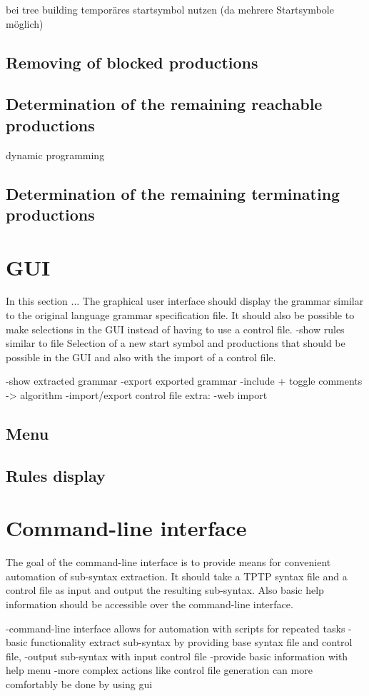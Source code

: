 bei tree building temporäres startsymbol nutzen (da mehrere Startsymbole möglich)
\subsection{Removing of blocked productions}

\subsection{Determination of the remaining reachable productions}  
dynamic programming
\subsection{Determination of the remaining terminating productions}

\section{GUI}\label{sec:ConceptGUI}
In this section ...
The graphical user interface should display the grammar similar to the original language grammar specification file.
It should also be possible to make selections in the GUI instead of having to use a control file. 
-show rules similar to file
Selection of a new start symbol and productions that should be possible in the GUI and also with the import of a control file.

-show extracted grammar
-export exported grammar
-include + toggle comments -> algorithm
-import/export control file
extra:
-web import
\subsection{Menu}\label{sec:ConceptGUIMenu}
\subsection{Rules display}\label{sec:ConceptRulesDisplay}


\section{Command-line interface}\label{sec:ConceptCommandLineInterface}
The goal of the command-line interface is to provide means for convenient automation of sub-syntax extraction. It should take a \ac{TPTP} syntax file and a control file as input and output the resulting sub-syntax. Also basic help information should be accessible over the command-line interface. 

-command-line interface allows for automation with scripts for repeated tasks
-basic functionality extract sub-syntax by providing base syntax file and control file, 
-output sub-syntax with input control file
-provide basic information with help menu
-more complex actions like control file generation can more comfortably be done by using gui